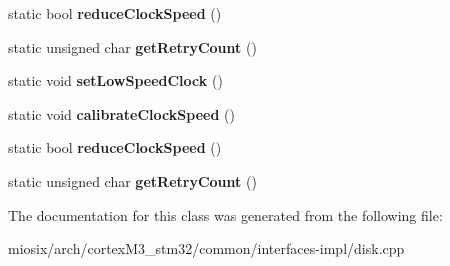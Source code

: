\begin{DoxyCompactItemize}
\item 
\hypertarget{classmiosix_1_1_clock_controller_a6abdf3d44ec84e4619bb0d018ac7e9e1}{static bool {\bfseries reduce\-Clock\-Speed} ()}\label{classmiosix_1_1_clock_controller_a6abdf3d44ec84e4619bb0d018ac7e9e1}

\item 
\hypertarget{classmiosix_1_1_clock_controller_a23e72801f95f7985eac2f0a176c73966}{static unsigned char {\bfseries get\-Retry\-Count} ()}\label{classmiosix_1_1_clock_controller_a23e72801f95f7985eac2f0a176c73966}

\item 
\hypertarget{classmiosix_1_1_clock_controller_a1a014861a74eaf0e93d545f1f0dd2eb8}{static void {\bfseries set\-Low\-Speed\-Clock} ()}\label{classmiosix_1_1_clock_controller_a1a014861a74eaf0e93d545f1f0dd2eb8}

\item 
\hypertarget{classmiosix_1_1_clock_controller_adcd906616759c7e73d94fa5d6c5b25f1}{static void {\bfseries calibrate\-Clock\-Speed} ()}\label{classmiosix_1_1_clock_controller_adcd906616759c7e73d94fa5d6c5b25f1}

\item 
\hypertarget{classmiosix_1_1_clock_controller_a6abdf3d44ec84e4619bb0d018ac7e9e1}{static bool {\bfseries reduce\-Clock\-Speed} ()}\label{classmiosix_1_1_clock_controller_a6abdf3d44ec84e4619bb0d018ac7e9e1}

\item 
\hypertarget{classmiosix_1_1_clock_controller_a23e72801f95f7985eac2f0a176c73966}{static unsigned char {\bfseries get\-Retry\-Count} ()}\label{classmiosix_1_1_clock_controller_a23e72801f95f7985eac2f0a176c73966}

\end{DoxyCompactItemize}


The documentation for this class was generated from the following file\-:\begin{DoxyCompactItemize}
\item 
miosix/arch/cortex\-M3\-\_\-stm32/common/interfaces-\/impl/disk.\-cpp\end{DoxyCompactItemize}
